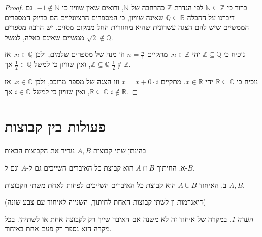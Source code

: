 \documentclass[
  hebrew,
  12pt,
  a4paper,
  oneside]{book}
\theoremstyle{definition}
\theoremstyle{remark}
\theoremstyle{plain}
\theoremstyle{remark}
\newtheorem*{remark}{הערה}
\begin{document}
\begin{proof}
ברור כי \(\mathbb{N}\subseteq\mathbb{Z}\) לפי הגדרת \(\mathbb{Z}\)
כהרחבה של \(\mathbb{N}\), ורואים שאין שוויון כי \(-1\notin\mathbb{N}\).
גם דיברנו על ההכלה \(\mathbb{Q}\subseteq\mathbb{R}\) שאינה שוויון, כי
המספרים הרציונליים הם בדיוק המספרים הממשיים שיש להם הצגה עשרונית שהיא
מחזורית החל ממקום מסוים. יש הרבה מספרים ממשיים שאינם כאלה, למשל
\(\sqrt{2}\notin\mathbb{Q}\).

נוכיח כי \(\mathbb{Z}\subseteq\mathbb{Q}\) יהי \(n\in\mathbb{Z}\).
מתקיים \(n=\frac{n}{1}\) וזו מנה של מספרים שלמים, ולכן
\(n\in\mathbb{Q}\). אז \(\mathbb{Z}\subseteq\mathbb{Q}\), ואין שוויון כי
למשל \(\frac{1}{2}\in\mathbb{Q}\) אך \(\frac{1}{2}\notin\mathbb{Z}\).

נוכיח כי \(\mathbb{\mathbb{R}}\subseteq\mathbb{\mathbb{C}}\) יהי
\(x\in\mathbb{\mathbb{R}}\). מתקיים \(x=x+0\cdot i\) וזו הצגה של מספר
מרוכב, ולכן \(x\in\mathbb{C}\). אז
\(\mathbb{\mathbb{R}}\subseteq\mathbb{\mathbb{C}}\), ואין שוויון כי למשל
\(i\in\mathbb{C}\) אך \(i\notin\mathbb{\mathbb{R}}\).
\end{proof}

\section{פעולות בין
קבוצות}\label{ux5e4ux5e2ux5d5ux5dcux5d5ux5ea-ux5d1ux5d9ux5df-ux5e7ux5d1ux5d5ux5e6ux5d5ux5ea}

\begin{definition}

בהינתן שתי קבוצות \(A,B\) נגדיר את הקבוצות הבאות

א. החיתוך \(A\cap B\) הוא קבוצת כל האיברים השייכים גם ל-\(A\) וגם
ל-\(B\).

ב. האיחוד \(A\cup B\) הוא קבוצת כל האיברים השייכים לפחות לאחת משתי
הקבוצות \(A,B\).

\end{definition}

(דיאגרמות ון לשתי קבוצות האחת לחיתוך, השנייה לאיחוד עם צבע שונה(

\begin{remark}
במקרה של איחוד זה לא משנה אם האיבר שייך רק לקבוצה אחת או לשתיהן. בכל
מקרה הוא נספר רק פעם אחת באיחוד.
\end{remark}
\end{document}
